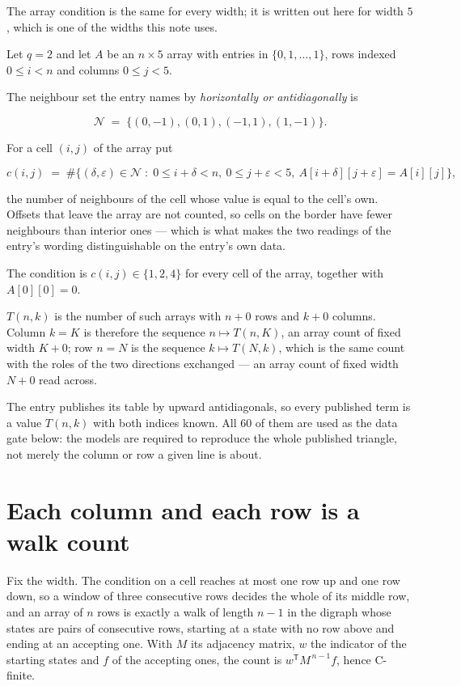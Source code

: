 \documentclass[11pt]{article}
\theoremstyle{definition}
\begin{document}
The array condition is the same for every width; it is written out here for width $5$, which is one of the widths this note uses.

Let $q = 2$ and let $A$ be an $n \times 5$ array with entries in $\{0,1,\dots,1\}$, rows indexed $0 \le i < n$ and columns $0 \le j < 5$.

The neighbour set the entry names by {\itshape horizontally or antidiagonally} is

\[\mathcal{N} \;=\; \{(0,-1), (0,1), (-1,1), (1,-1)\}.\]

For a cell $(i,j)$ of the array put

\[c(i,j) \;=\; \#\bigl\{(\delta,\varepsilon)\in\mathcal{N} \;:\; 0\le i+\delta<n,\ 0\le j+\varepsilon<5,\ A[i+\delta][j+\varepsilon] = A[i][j]\bigr\},\]

the number of neighbours of the cell whose value is equal to the cell's own. Offsets that leave the array are not counted, so cells on the border have fewer neighbours than interior ones --- which is what makes the two readings of the entry's wording distinguishable on the entry's own data.

The condition is $c(i,j) \in \{1, 2, 4\}$ for every cell of the array, together with $A[0][0]=0$.

$T(n,k)$ is the number of such arrays with $n + 0$ rows and $k + 0$ columns. Column $k = K$ is therefore the sequence $n \mapsto T(n,K)$, an array count of fixed width $K + 0$; row $n = N$ is the sequence $k \mapsto T(N,k)$, which is the same count with the roles of the two directions exchanged --- an array count of fixed width $N + 0$ read across.

The entry publishes its table by upward antidiagonals, so every published term is a value $T(n,k)$ with both indices known. All 60 of them are used as the data gate below: the models are required to reproduce the whole published triangle, not merely the column or row a given line is about.

\section{Each column and each row is a walk count}

Fix the width. The condition on a cell reaches at most one row up and one row down, so a window of three consecutive rows decides the whole of its middle row, and an array of $n$ rows is exactly a walk of length $n-1$ in the digraph whose states are pairs of consecutive rows, starting at a state with no row above and ending at an accepting one. With $M$ its adjacency matrix, $w$ the indicator of the starting states and $f$ of the accepting ones, the count is $w^{\mathsf T}M^{\,n-1}f$, hence C-finite.
\end{document}

